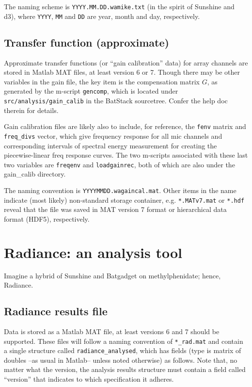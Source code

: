 \documentclass[letterpaper]{article}
\begin{document}
The naming scheme is \texttt{YYYY.MM.DD.wamike.txt} (in the spirit of
Sunshine and d3), where \texttt{YYYY}, \texttt{MM} and \texttt{DD} are
year, month and day, respectively.

\subsection{Transfer function (approximate)}
\label{gaincalfile:sec}

Approximate transfer functions (or ``gain calibration'' data) for
array channels are stored in Matlab MAT files, at least version 6 or
7. Though there may be other variables in the gain file, the key item
is the compensation matrix $G$, as generated by the m-script
\texttt{gencomp}, which is located under
\texttt{src/analysis/gain\_calib} in the BatStack sourcetree. Confer
the help doc therein for details.

Gain calibration files are likely also to include, for reference, the
\texttt{fenv} matrix and \texttt{freq\_divs} vector, which give
frequency response for all mic channels and corresponding intervals of
spectral energy measurement for creating the piecewise-linear freq
response curves. The two m-scripts associated with these last two
variables are \texttt{freqenv} and \texttt{loadgainrec}, both of which
are also under the gain\_calib directory.

The naming convention is \texttt{YYYYMMDD.wagaincal.mat}. Other items
in the name indicate (most likely) non-standard storage container,
e.g. \texttt{*.MATv7.mat} or \texttt{*.hdf} reveal that the file was
saved in MAT version 7 format or hierarchical data format (HDF5),
respectively.

\section{Radiance: an analysis tool}
\label{radiance:sec}

Imagine a hybrid of Sunshine and Batgadget on methylphenidate; hence,
Radiance.

\subsection{Radiance results file}

Data is stored as a Matlab MAT file, at least versions 6 and 7 should
be supported. These files will follow a naming convention of
\texttt{*\_rad.mat} and contain a single structure called
\texttt{radiance\_analysed}, which has fields (type is matrix of
doubles --as usual in Matlab-- unless noted otherwise) as
follows. Note that, no matter what the version, the analysis results
structure must contain a field called ``version'' that indicates to
which specification it adheres.
\end{document}

